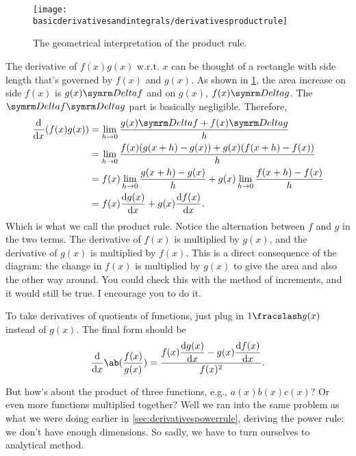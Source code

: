 \begin{figure}[h]
    \centering
    \texttt{[image: basicderivativesandintegrals/derivativesproductrule]}
    \caption{The geometrical interpretation of the product rule.}
    \label{fig:derivativesproductrule}
\end{figure}
The derivative of $f(x)g(x)$ w.r.t. $x$ can be thought of a rectangle with side length that's governed by $f(x)$ and $g(x)$. As shown in \cref{fig:derivativesproductrule}, the area increase on side $f(x)$ is $g(x)\Dd{f}$ and on $g(x)$, $f(x)\Dd{g}$. The $\Dd{f}\Dd{g}$ part is basically negligible. Therefore,
\begin{align*}
    \odv*{(f(x)g(x))}{x} &= \lim_{h \appr 0}\frac{g(x)\Dd{f} + f(x)\Dd{g}}{h} \\
    &= \lim_{h \appr 0}\frac{f(x)(g(x + h) - g(x)) + g(x)(f(x + h) - f(x))}{h} \\
    &= f(x)\lim_{h \appr 0}\frac{g(x + h) - g(x)}{h} + g(x)\lim_{h \appr 0}\frac{f(x + h) - f(x)}{h} \\
    &= f(x)\odv{g(x)}{x} + g(x)\odv{f(x)}{x}.
\end{align*}
Which is what we call the product rule. Notice the alternation between $f$ and $g$ in the two terms. The derivative of $f(x)$ is multiplied by $g(x)$, and the derivative of $g(x)$ is multiplied by $f(x)$. This is a direct consequence of the diagram: the change in $f(x)$ is multiplied by $g(x)$ to give the area and also the other way around. You could check this with the method of increments, and it would still be true. I encourage you to do it.

To take derivatives of quotients of functions, just plug in $\flatfrac{1}{g(x)}$ instead of $g(x)$. The final form should be
\begin{equation}
    \odv*{\ab(\frac{f(x)}{g(x)})}{x} = \frac{\displaystyle f(x)\odv{g(x)}{x} - g(x)\odv{f(x)}{x}}{f(x)^2}.
\end{equation}

But how's about the product of three functions, e.g., $a(x)b(x)c(x)$? Or even more functions multiplied together? Well we ran into the same problem as what we were doing earlier in \cref{sec:derivativespowerrule}, deriving the power rule: we don't have enough dimensions. So sadly, we have to turn ourselves to analytical method.

